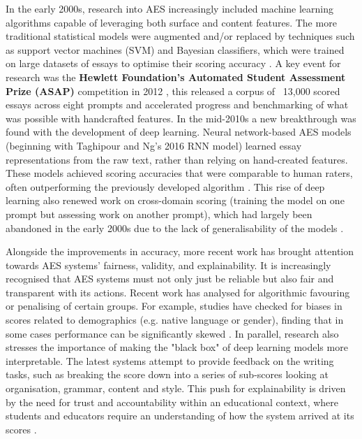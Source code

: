 \documentclass[10pt]{report}
\begin{document}
In the early 2000s, research into AES increasingly included machine learning algorithms capable of leveraging both surface and content features. The more traditional statistical models were augmented and/or replaced by techniques such as support vector machines (SVM) and Bayesian classifiers, which were trained on large datasets of essays to optimise their scoring accuracy \parencite{shermis2013handbook}. A key event for research was the \textbf{Hewlett Foundation’s Automated Student Assessment Prize (ASAP)} competition in 2012 \parencite{asap2012kaggle},  this released a corpus of ~13,000 scored essays across eight prompts and accelerated progress and benchmarking of what was possible with handcrafted features. In the mid-2010s a new breakthrough was found with the development of deep learning. Neural network-based AES models (beginning with Taghipour and Ng's 2016 RNN model) learned essay representations from the raw text, rather than relying on hand-created features. These models achieved scoring accuracies that were comparable to human raters, often outperforming the previously developed algorithm \parencite{taghipour2016neural}. This rise of deep learning also renewed work on cross-domain scoring (training the model on one prompt but assessing work on another prompt), which had largely been abandoned in the early 2000s due to the lack of generalisability of the models \parencite{beigman2021narrative}.

Alongside the improvements in accuracy, more recent work has brought attention towards AES systems’ fairness, validity, and explainability. It is increasingly recognised that AES systems must not only just be reliable but also fair and transparent with its actions. Recent work has analysed for algorithmic favouring or penalising of certain groups. For example, studies have checked for biases in scores related to demographics (e.g. native language or gender), finding that in some cases performance can be significantly skewed \parencite{blodgett2020language}. In parallel, research also stresses the importance of making the "black box" of deep learning models more interpretable. The latest systems attempt to provide feedback on the writing tasks, such as breaking the score down into a series of sub-scores looking at organisation, grammar, content and style. This push for explainability is driven by the need for trust and accountability within an educational context, where students and educators require an understanding of how the system arrived at its scores \parencite{lundberg2017unified}.
\end{document}
